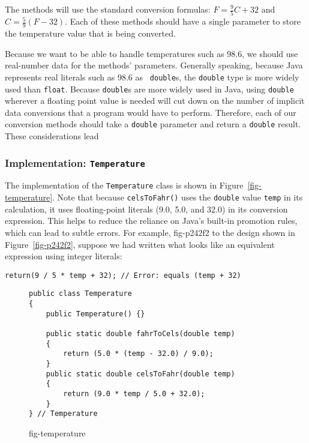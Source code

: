 The methods will use the standard conversion formulas: $F =
\frac{9}{5}C + 32$ and $C = \frac{5}{9}(F - 32)$. Each of these
methods should have a single parameter to store the temperature value
that is being converted.

Because we want to be able to handle temperatures such as 98.6, 
we should use real-number data for the methods' parameters.  Generally
speaking, because Java represents real literals such as 98.6 as {\tt
double}s, the {\tt double} type is more widely used than {\tt float}.
Because {\tt double}s are more widely used in Java, using {\tt double}
wherever a floating point value is needed will cut down on the number
of implicit data conversions that a program would have to perform.
Therefore, each of our conversion methods should take a {\tt double}
parameter and return a {\tt double} result.  These considerations lead


\subsubsection*{Implementation: {\tt Temperature}}

\noindent The implementation of the {\tt Temperature} class is shown in
Figure~\ref{fig-temperature}.  Note that because {\tt celsToFahr()}
uses the {\tt double} value {\tt temp} in its calculation, it uses
floating-point literals (9.0, 5.0, and 32.0) in its conversion
expression. This helps to reduce the reliance on Java's built-in
promotion rules, which can lead to subtle errors.  For example,
{fig-p242f2}
to the design shown in Figure~\ref{fig-p242f2},
suppose we had written what looks like an equivalent expression using
integer literals:

\begin{jjjlisting}
\begin{lstlisting}
return(9 / 5 * temp + 32); // Error: equals (temp + 32)
\end{lstlisting}
\end{jjjlisting}

\begin{figure}[b!]
\jjjprogstart
\begin{jjjlisting}
\begin{lstlisting}
public class Temperature
{   
    public Temperature() {}

    public static double fahrToCels(double temp)
    {   
        return (5.0 * (temp - 32.0) / 9.0);
    }
    public static double celsToFahr(double temp)
    {   
        return (9.0 * temp / 5.0 + 32.0);
    }
} // Temperature
\end{lstlisting}
\end{jjjlisting}
{fig-temperature}
\end{figure}

